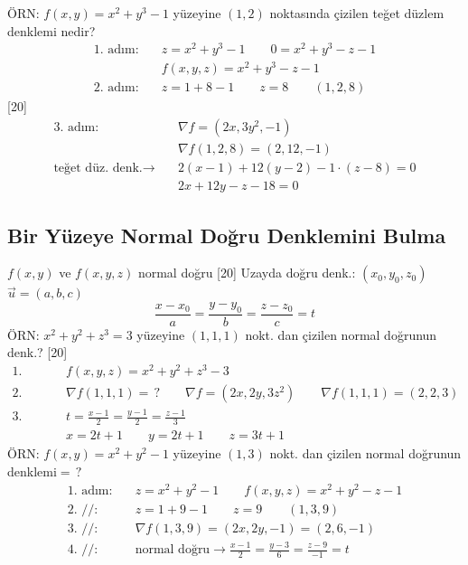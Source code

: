 \documentclass[11pt,a4paper]{article}
\begin{document}
ÖRN: $f(x,y)=x^2+y^3-1$ yüzeyine $(1,2)$ noktasında çizilen teğet düzlem denklemi nedir?
\begin{align*}
\text{1. adım:}&\quad z=x^2+y^3-1\qquad0=x^2+y^3-z-1\\
&\quad f(x,y,z)=x^2+y^3-z-1\\
\text{2. adım:}&\quad z=1+8-1\qquad z=8\qquad(1,2,8)
\end{align*}
[20]
\begin{align*}
\text{3. adım:}&\quad\nabla f=(2x,3y^2,-1)\\
&\quad\nabla f(1,2,8)=(2,12,-1)\\
\text{teğet düz. denk.}\to&\quad2(x-1)+12(y-2)-1\cdot(z-8)=0\\
&\quad2x+12y-z-18=0
\end{align*}

\subsection{Bir Yüzeye Normal Doğru Denklemini Bulma}
$f(x,y)$ ve $f(x,y,z)$ \quad normal doğru
[20]
Uzayda doğru denk.: $(x_0,y_0,z_0)$ \quad $\vec{u}=(a,b,c)$
\[ \frac{x-x_0}{a}=\frac{y-y_0}{b}=\frac{z-z_0}{c}=t \]
ÖRN: $x^2+y^2+z^3=3$ yüzeyine $(1,1,1)$ nokt. dan çizilen normal doğrunun denk.?
[20]
\begin{align*}
\text{1. adım:}&\quad f(x,y,z)=x^2+y^2+z^3-3\\
\text{2. adım:}&\quad\nabla f(1,1,1)=\,?\qquad\nabla f=(2x,2y,3z^2)\qquad\nabla f(1,1,1)=(2,2,3)\\
\text{3. adım:}&\quad t=\frac{x-1}{2}=\frac{y-1}{2}=\frac{z-1}{3}\\
&\quad x=2t+1\qquad y=2t+1\qquad z=3t+1
\end{align*}
ÖRN: $f(x,y)=x^2+y^2-1$ yüzeyine $(1,3)$ nokt. dan çizilen normal doğrunun denklemi$=\,?$
\begin{align*}
\text{1. adım:}&\quad z=x^2+y^2-1\qquad f(x,y,z)=x^2+y^2-z-1\\
\text{2. //}:&\quad z=1+9-1\qquad z=9\qquad(1,3,9)\\
\text{3. //}:&\quad\nabla f(1,3,9)=(2x,2y,-1)=(2,6,-1)\\
\text{4. //}:&\quad\text{normal doğru}\to\frac{x-1}{2}=\frac{y-3}{6}=\frac{z-9}{-1}=t
\end{align*}
\end{document}
